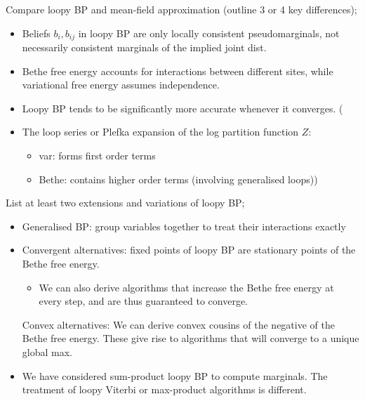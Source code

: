 \documentclass{article}
\begin{document}
Compare loopy BP and mean-field approximation (outline 3 or 4 key differences); \begin{itemize}
    \item Beliefs $b_i, b_{ij}$ in loopy BP are only locally consistent pseudomarginals, not necessarily consistent marginals of the implied joint dist.
    \item Bethe free energy accounts for interactions between different sites, while variational free energy assumes independence.
    \item Loopy BP tends to be significantly more accurate whenever it converges.
    (\item The loop series or Plefka expansion of the log partition function $Z$: \begin{itemize}
        \item var: forms first order terms
        \item Bethe: contains higher order terms (involving generalised loops))
    \end{itemize}
\end{itemize}

List at least two extensions and variations of loopy BP; \begin{itemize}
    \item Generalised BP: group variables together to treat their interactions exactly
    \item Convergent alternatives: fixed points of loopy BP are stationary points of the Bethe free energy. \begin{itemize}
        \item We can also derive algorithms that increase the Bethe free energy at every step, and are thus guaranteed to converge.
    \end{itemize}
    \time Convex alternatives: We can derive convex cousins of the negative of the Bethe free energy. These give rise to algorithms that will converge to a unique global max.
    \item We have considered sum-product loopy BP to compute marginals. The treatment of loopy Viterbi or max-product algorithms is different.
\end{itemize}
\end{document}
